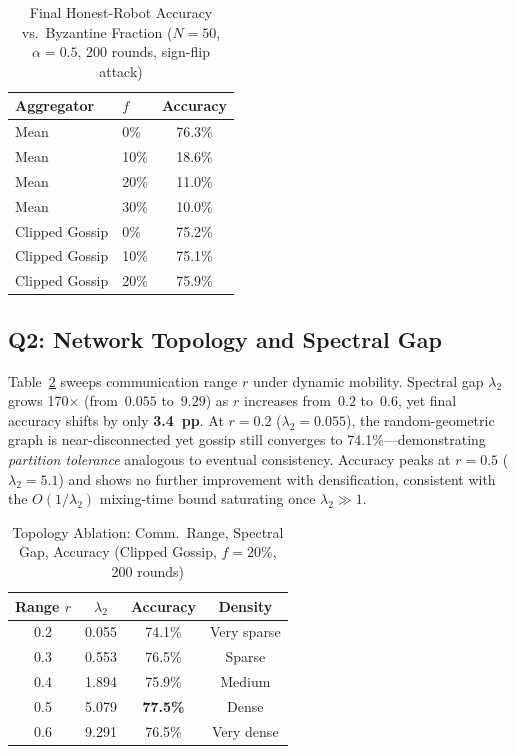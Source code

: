 \documentclass[conference]{IEEEtran}
\begin{document}
\begin{table}[h]
\centering
\caption{Final Honest-Robot Accuracy vs.\ Byzantine Fraction
($N{=}50$, $\alpha{=}0.5$, 200 rounds, sign-flip attack)}
\label{tab:byz}
\begin{tabular}{@{}llc@{}}
\toprule
Aggregator & $f$ & Accuracy \\
\midrule
Mean           & 0\%  & 76.3\% \\
Mean           & 10\% & 18.6\% \\
Mean           & 20\% & 11.0\% \\
Mean           & 30\% & 10.0\% \\
\midrule
Clipped Gossip & 0\%  & 75.2\% \\
Clipped Gossip & 10\% & 75.1\% \\
Clipped Gossip & 20\% & 75.9\% \\
\bottomrule
\end{tabular}
\end{table}

\subsection{Q2: Network Topology and Spectral Gap}

Table~\ref{tab:topo} sweeps communication range $r$ under dynamic mobility.
Spectral gap $\lambda_2$ grows 170${\times}$ (from~$0.055$ to~$9.29$) as
$r$ increases from~$0.2$ to~$0.6$, yet final accuracy shifts by only
\textbf{3.4~pp}.
At $r{=}0.2$ ($\lambda_2{=}0.055$), the random-geometric graph is
near-disconnected yet gossip still converges to 74.1\%---demonstrating
\emph{partition tolerance} analogous to eventual consistency.
Accuracy peaks at $r{=}0.5$ ($\lambda_2{=}5.1$) and shows no further
improvement with densification, consistent with the $O(1/\lambda_2)$
mixing-time bound saturating once $\lambda_2 \gg 1$.

\begin{table}[h]
\centering
\caption{Topology Ablation: Comm.\ Range, Spectral Gap, Accuracy
(Clipped Gossip, $f{=}20\%$, 200 rounds)}
\label{tab:topo}
\begin{tabular}{@{}cccc@{}}
\toprule
Range $r$ & $\lambda_2$ & Accuracy & Density \\
\midrule
0.2 & 0.055 & 74.1\% & Very sparse \\
0.3 & 0.553 & 76.5\% & Sparse \\
0.4 & 1.894 & 75.9\% & Medium \\
0.5 & 5.079 & \textbf{77.5\%} & Dense \\
0.6 & 9.291 & 76.5\% & Very dense \\
\bottomrule
\end{tabular}
\end{table}
\end{document}

